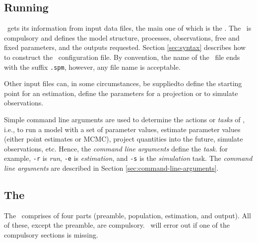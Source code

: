 \subsection{Running \SPM}

\SPM\ gets its information from input data files, the main one of which is the \config. The \config\ is compulsory and defines the model structure, processes, observations, free and fixed parameters, and the outputs requested. Section \ref{sec:syntax} describes how to construct the \SPM\ configuration file. By convention, the name of the \config\ file ends with the suffix \texttt{.spm}, however, any file name is acceptable.

Other input files can, in some circumstances, be supplied\textemdash to define the starting point for an estimation, define the parameters for a projection or to simulate observations.  

Simple command line arguments are used to determine the actions or \emph{tasks} of \SPM, i.e., to run a model with a set of parameter values, estimate parameter values (either point estimates or MCMC), project quantities into the future, simulate observations, etc. Hence, the \emph{command line arguments} define the \emph{task}. for example, \texttt{-r} is \emph{run}, \texttt{-e} is \emph{estimation}, and \texttt{-s} is the \emph{simulation} task. The \emph{command line arguments} are described in Section \ref{sec:command-line-arguments}.

\subsection{The \config\label{sec:config-files}}

The \config\ comprises of four parts (preamble, population, estimation, and output). All of these, except the preamble, are compulsory. \SPM\ will error out if one of the compulsory sections is missing.

